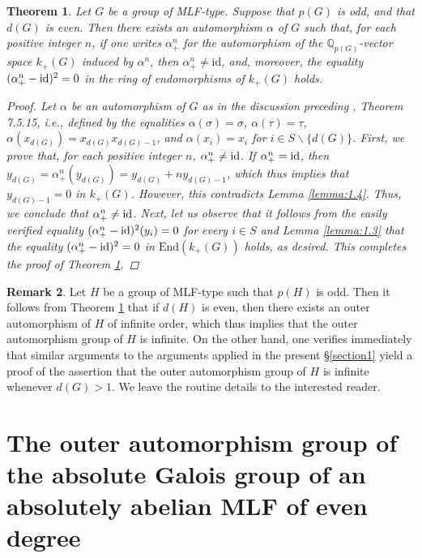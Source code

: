 \documentclass[11pt,showkeys]{article}
\theoremstyle{theorem}
\newtheorem{theorem}{Theorem}[section]
\theoremstyle{definition}
\newtheorem{remark}[theorem]{Remark}
\def\End{{\mbox{End}}}
\begin{document}
\begin{theorem}\label{theorem:1.5}
 Let $G$ be a group of MLF-type.  Suppose that $p(G)$ is odd, and that $d(G)$ is even.  Then there exists an automorphism $\alpha$ of $G$ such that, for each positive integer $n$, if one writes $\alpha^n_+$ for the automorphism of the $\mathbb{Q}_{p(G)}$-vector space $k_+(G)$ induced by $\alpha^n$, then $\alpha^n_+ \neq \mathrm{id}$, and, moreover, the equality $(\alpha^n_{+}- {\rm id})^2 = 0$ in the ring of endomorphisms of $k_+(G)$ holds.  
\begin{proof} 
Let $\alpha$ be an automorphism of $G$ as in the discussion preceding \cite{NSW}, Theorem 7.5.15, i.e., defined by the equalities $\alpha(\sigma) = \sigma$, $\alpha(\tau) = \tau$, $\alpha(x_{d(G)}) = x_{d(G)} x_{d(G)-1}$, and $\alpha(x_i) = x_i$ for $i\in S \backslash \{d(G)\}$. First, we prove that, for each positive integer $n$, $\alpha_+^n \neq {\rm id}$. If $\alpha_+^n = {\rm id}$, then $y_{d(G)} = \alpha^n_+(y_{d(G)}) = y_{d(G)} + ny_{d(G)-1}$, which thus implies that $y_{d(G)-1} = 0$ in $k_{+}(G)$. However, this contradicts Lemma \ref{lemma:1.4}. Thus, we conclude that $\alpha_+^n \neq {\rm id}$. Next, let us observe that  it follows from the easily verified equality $(\alpha^n_+ - {\rm id})^2 (y_i) = 0$ for every $i \in S$ and Lemma \ref{lemma:1.3} that the equality $(\alpha^n_+- {\rm id})^2 = 0$ in $\End(k_+(G))$ holds, as desired. This completes the proof of Theorem \ref{theorem:1.5}. 
\end{proof}
\end{theorem}

\begin{remark}
Let $H$ be a group of MLF-type such that $p(H)$ is odd.  Then it follows from Theorem \ref{theorem:1.5} that if $d(H)$ is even, then there exists an outer automorphism of $H$ of infinite order, which thus implies that the outer automorphism group of $H$ is infinite.  On the other hand, one verifies immediately that similar arguments to the arguments applied in the present \S \ref{section1} yield a proof of the assertion that the outer automorphism group of $H$ is infinite whenever $d(G) > 1$.  We leave the routine details to the interested reader.  
\end{remark}

\section{The outer automorphism group of the absolute Galois group of an absolutely abelian MLF of even degree}\label{section2}
\end{document}
